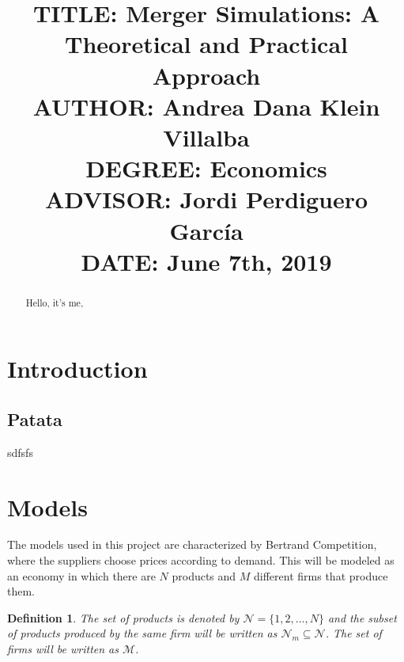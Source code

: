 \documentclass[12pt]{article}
\newtheorem{defi}{{Definition}}
\begin{document}

\title{{\large TITLE: Merger Simulations: A Theoretical and Practical Approach\\
AUTHOR: Andrea Dana Klein Villalba\\
DEGREE: Economics\\
ADVISOR: Jordi Perdiguero Garc\'ia\\
DATE: June 7th, 2019\\}}
\date{}

\clearpage\maketitle
\thispagestyle{empty}
\newpage

\begin{abstract}
Hello, it's me,
\end{abstract}
\newpage

 \tableofcontents
 \newpage

\section{Introduction}



\subsection{Patata}
sdfsfs


\section{Models}

The models used in this project are characterized by Bertrand Competition, where the suppliers choose prices according to demand. This will be modeled as an economy in which there are $N$ products and $M$ different firms that produce them.

\begin{defi}
The set of products is denoted by $\mathcal{N} = \{1, 2, \dots, N\}$ and the subset of products produced by the same firm will be written as $\mathcal{N}_m \subseteq \mathcal{N}$. The set of firms will be written as $\mathcal{M}$.
\end{defi}
\end{document}
